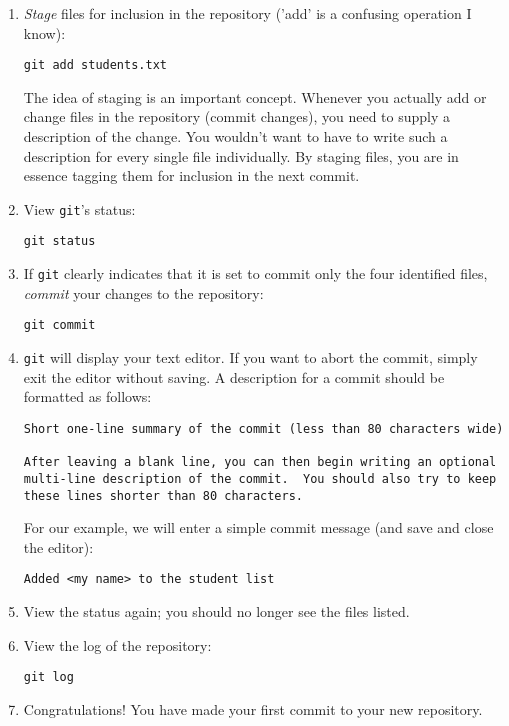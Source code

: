 \documentclass[letterpaper]{article}
\begin{document}
\begin{enumerate}
\item {\em Stage} files for inclusion in the repository ('add' is a confusing operation I know):
  \begin{verbatim}
git add students.txt
\end{verbatim}

  The idea of staging is an important concept.
  Whenever you actually add or change files in the repository (commit changes), you need to supply a description of the change.
  You wouldn't want to have to write such a description for every single file individually.
  By staging files, you are in essence tagging them for inclusion in the next commit.
\item View {\tt git}'s status:
  \begin{verbatim}
git status
\end{verbatim}
\item If {\tt git} clearly indicates that it is set to commit only the four identified files, {\em commit} your changes to the repository:
  \begin{verbatim}
git commit
\end{verbatim}
\item {\tt git} will display your text editor.
  If you want to abort the commit, simply exit the editor without saving.
  A description for a commit should be formatted as follows:
  \begin{verbatim}
Short one-line summary of the commit (less than 80 characters wide)

After leaving a blank line, you can then begin writing an optional
multi-line description of the commit.  You should also try to keep
these lines shorter than 80 characters.
\end{verbatim}
  For our example, we will enter a simple commit message (and save and close the editor):
  \begin{verbatim}
Added <my name> to the student list
\end{verbatim}
\item View the status again; you should no longer see the files listed.
\item View the log of the repository:
  \begin{verbatim}
git log
\end{verbatim}
\item Congratulations!
  You have made your first commit to your new repository.
\end{enumerate}
\end{document}
